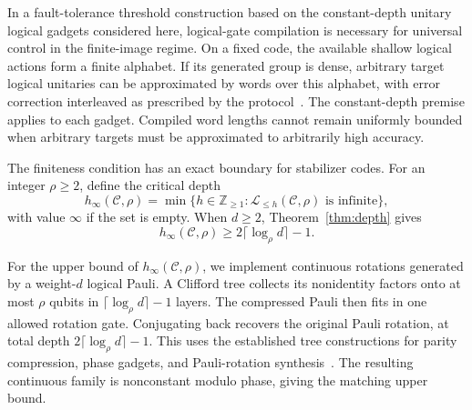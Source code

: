 \documentclass[aps,prl,reprint,notitlepage,nofootinbib,nobibnotes]{revtex4-2}
\begin{document}
In a fault-tolerance threshold construction based on the constant-depth
unitary logical gadgets considered here, logical-gate compilation is
necessary for universal control in the finite-image regime. On a fixed
code, the available shallow logical actions form a finite alphabet. If
its generated group is dense, arbitrary target logical unitaries can be
approximated by words over this alphabet, with error correction
interleaved as prescribed by the protocol~\cite{Gottesman,Dua}. The
constant-depth premise applies to each gadget. Compiled word lengths cannot
remain uniformly bounded when arbitrary targets must be approximated to
arbitrarily high accuracy.

The finiteness condition has an exact boundary for stabilizer codes. For an integer \(\rho\ge2\), define the critical depth
\begin{equation}\label{eq:critical-definition}
 h_\infty(\mathcal C,\rho)
  =\min\{h\in\mathbb Z_{\ge1}:\mathcal L_{\le h}(\mathcal C,\rho)
                   \text{ is infinite}\},
\end{equation}
with value \(\infty\) if the set is empty. When \(d\ge2\), Theorem~\ref{thm:depth} gives
\begin{equation}\label{eq:critical-lower}
 h_\infty(\mathcal C,\rho)\ge2\lceil\log_{\rho} d\rceil-1.
\end{equation}

For the upper bound of $h_\infty(\mathcal C,\rho)$, we implement continuous
rotations generated by a weight-\(d\) logical Pauli. A Clifford tree
collects its nonidentity factors onto at most \(\rho\) qubits in
\(\lceil\log_\rho d\rceil-1\) layers. The compressed Pauli then fits
in one allowed rotation gate. Conjugating back recovers the original
Pauli rotation, at total depth \(2\lceil\log_\rho d\rceil-1\).
This uses the established tree constructions for parity compression,
phase gadgets, and Pauli-rotation
synthesis~\cite{BonetMonroig,Cowtan,HaahLiuTan}.
The resulting continuous family is nonconstant modulo phase, giving
the matching upper bound.
\end{document}
